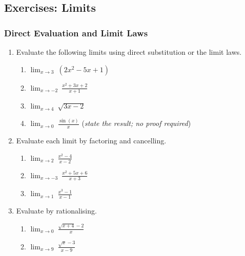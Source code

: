 
\subsection*{Exercises: Limits}

\subsubsection*{Direct Evaluation and Limit Laws}

\begin{enumerate}

\item Evaluate the following limits using direct substitution or
      the limit laws.
      \begin{enumerate}
        \item $\displaystyle\lim_{x \to 3}\ (2x^2 - 5x + 1)$
        \item $\displaystyle\lim_{x \to -2}\ \frac{x^2 + 3x + 2}{x + 1}$
        \item $\displaystyle\lim_{x \to 4}\ \sqrt{3x - 2}$
        \item $\displaystyle\lim_{x \to 0}\ \frac{\sin(x)}{x}$
              \quad (\textit{state the result; no proof required})
      \end{enumerate}

\item Evaluate each limit by factoring and cancelling.
      \begin{enumerate}
        \item $\displaystyle\lim_{x \to 2}\ \frac{x^2 - 4}{x - 2}$
        \item $\displaystyle\lim_{x \to -3}\ \frac{x^2 + 5x + 6}{x + 3}$
        \item $\displaystyle\lim_{x \to 1}\ \frac{x^3 - 1}{x - 1}$
      \end{enumerate}

\item Evaluate by rationalising.
      \begin{enumerate}
        \item $\displaystyle\lim_{x \to 0}\ \frac{\sqrt{x + 4} - 2}{x}$
        \item $\displaystyle\lim_{x \to 9}\ \frac{\sqrt{x} - 3}{x - 9}$
      \end{enumerate}


\end{enumerate}
